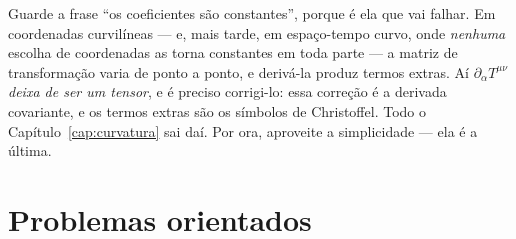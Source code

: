\documentclass[12pt,a4paper,oneside]{book}
\theoremstyle{rgplain}
\theoremstyle{rgremark}
\begin{document}
\begin{atencao}
Guarde a frase ``os coeficientes são constantes'', porque é ela que vai
falhar. Em coordenadas curvilíneas --- e, mais tarde, em espaço-tempo curvo,
onde \emph{nenhuma} escolha de coordenadas as torna constantes em toda parte
--- a matriz de transformação varia de ponto a ponto, e derivá-la produz
termos extras. Aí $\partial_\alpha T^{\mu\nu}$ \emph{deixa de ser um tensor},
e é preciso corrigi-lo: essa correção é a derivada covariante, e os termos
extras são os símbolos de Christoffel. Todo o Capítulo~\ref{cap:curvatura}
sai daí. Por ora, aproveite a simplicidade --- ela é a última.
\end{atencao}

\section{Problemas orientados}
\end{document}
